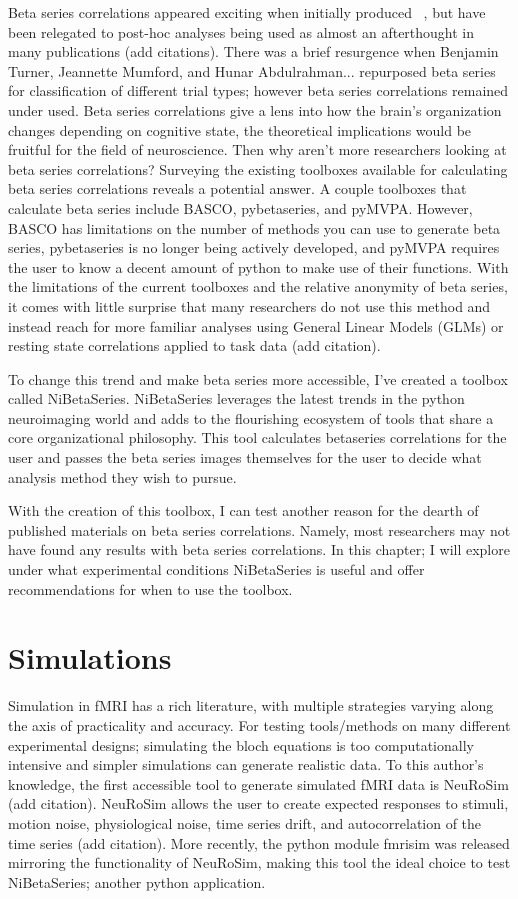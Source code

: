 \documentclass[phd,appendix,figures]{uithesis}
\begin{document}
\begin{itemize}
Beta series correlations appeared exciting when initially produced ~\citep{Rissman2004},
but have been relegated to post-hoc analyses being used as almost an afterthought in many
publications (add citations).
There was a brief resurgence when Benjamin Turner, Jeannette Mumford, and Hunar Abdulrahman... repurposed
beta series for classification of different trial types; however beta series correlations
remained under used.
Beta series correlations give a lens into how the brain's organization changes depending
on cognitive state, the theoretical implications would be fruitful for the field of neuroscience.
Then why aren't more researchers looking at beta series correlations?
Surveying the existing toolboxes available for calculating beta series correlations reveals a
potential answer.
A couple toolboxes that calculate beta series include BASCO, pybetaseries, and pyMVPA.
However, BASCO has limitations on the number of methods you can use to generate beta series,
pybetaseries is no longer being actively developed, and pyMVPA requires the user to know
a decent amount of python to make use of their functions.
With the limitations of the current toolboxes and the relative anonymity of beta series,
it comes with little surprise that many researchers do not use this method and instead reach for
more familiar analyses using General Linear Models (GLMs) or resting state correlations applied
to task data (add citation).

To change this trend and make beta series more accessible, I've created a toolbox called NiBetaSeries.
NiBetaSeries leverages the latest trends in the python neuroimaging world and adds to the flourishing
ecosystem of tools that share a core organizational philosophy.
This tool calculates betaseries correlations for the user and passes the beta series images themselves
for the user to decide what analysis method they wish to pursue.

With the creation of this toolbox, I can test another reason for the dearth of published materials on
beta series correlations.
Namely, most researchers may not have found any results with beta series correlations.
In this chapter; I will explore under what experimental conditions NiBetaSeries is useful and offer
recommendations for when to use the toolbox.

\section{Simulations}
Simulation in fMRI has a rich literature, with multiple strategies varying along the axis
of practicality and accuracy.
For testing tools/methods on many different experimental designs; simulating the bloch equations
is too computationally intensive and simpler simulations can generate realistic data.
To this author's knowledge, the first accessible tool to generate simulated fMRI data is NeuRoSim (add citation).
NeuRoSim allows the user to create expected responses to stimuli, motion noise, physiological noise,
time series drift, and autocorrelation of the time series (add citation).
More recently, the python module fmrisim was released mirroring the functionality of NeuRoSim, making this tool
the ideal choice to test NiBetaSeries; another python application.



\end{itemize}
\end{document}
